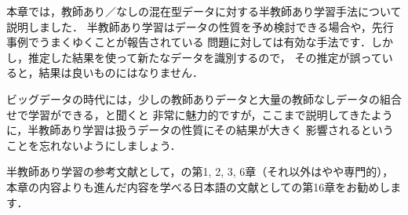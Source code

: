 

本章では，教師あり／なしの混在型データに対する半教師あり学習手法について説明しました．
半教師あり学習はデータの性質を予め検討できる場合や，先行事例でうまくゆくことが報告されている
問題に対しては有効な手法です．しかし，推定した結果を使って新たなデータを識別するので，
その推定が誤っていると，結果は良いものにはなりません．

ビッグデータの時代には，少しの教師ありデータと大量の教師なしデータの組合せで学習ができる，と聞くと
非常に魅力的ですが，ここまで説明してきたように，半教師あり学習は扱うデータの性質にその結果が大きく
影響されるということを忘れないようにしましょう．

半教師あり学習の参考文献として，\cite{Chapelle10}の第1, 2, 3, 6章（それ以外はやや専門的），本章の内容よりも進んだ内容を学べる日本語の文献として\cite{sugiyama13}の第16章をお勧めします．


